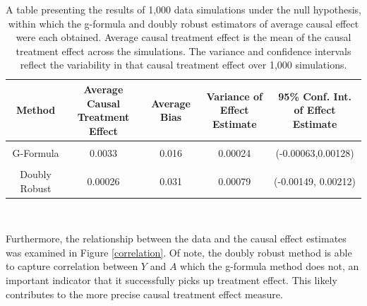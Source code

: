 \begin{table}[h!]
\centering
\begin{tabular}{c | c c c c }
Method & \shortstack{Average Causal \\ Treatment Effect} & Average Bias & \shortstack{Variance of \\ Effect Estimate} & \shortstack{95\% Conf. Int.\\ of Effect Estimate} \\ 
\hline \\
G-Formula & 0.0033 & 0.016 & 0.00024&(-0.00063,0.00128)\\ \\ 
Doubly Robust & 0.00026 & 0.031& 0.00079 & (-0.00149, 0.00212)
\end{tabular} \\
\centering
\caption[Simulation results under the null hypothesis]{A table presenting the results of 1,000 data simulations under the null hypothesis, within which the g-formula and doubly robust estimators of average causal effect were each obtained.  Average causal treatment effect is the mean of the causal treatment effect across the simulations.  The variance and confidence intervals reflect the variability in that causal treatment effect over 1,000 simulations. \label{simdata}}
\end{table}


Furthermore, the relationship between the data and the causal effect estimates was examined in Figure \ref{correlation}.  Of note, the doubly robust method is able to capture correlation between $Y$ and $A$ which the g-formula method does not, an important indicator that it successfully picks up treatment effect.  This likely contributes to the more precise causal treatment effect measure.  



